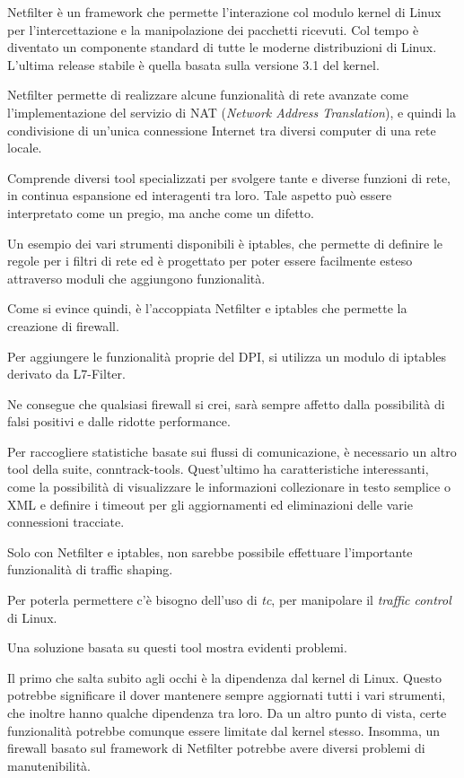 Netfilter \cite{netfilter} è un framework che permette l'interazione col modulo kernel di Linux per l'intercettazione e la manipolazione dei pacchetti ricevuti. Col tempo è diventato un componente standard di tutte le moderne distribuzioni di Linux. L'ultima release stabile è quella basata sulla versione 3.1 del kernel.

Netfilter permette di realizzare alcune funzionalità di rete avanzate come l'implementazione del servizio di NAT (\emph{Network Address Translation}), e quindi la condivisione di un'unica connessione Internet tra diversi computer di una rete locale.

Comprende diversi tool specializzati per svolgere tante e diverse funzioni di rete, in continua espansione ed interagenti tra loro. Tale aspetto può essere interpretato come un pregio, ma anche come un difetto.

Un esempio dei vari strumenti disponibili è iptables, che permette di definire le regole per i filtri di rete ed è progettato per poter essere facilmente esteso attraverso moduli che aggiungono funzionalità.

Come si evince quindi, è l'accoppiata Netfilter e iptables che permette la creazione di firewall.

Per aggiungere le funzionalità proprie del DPI, si utilizza un modulo di iptables derivato da L7-Filter.

Ne consegue che qualsiasi firewall si crei, sarà sempre affetto dalla possibilità di falsi positivi e dalle ridotte performance.

Per raccogliere statistiche basate sui flussi di comunicazione, è necessario un altro tool della suite, conntrack-tools. Quest'ultimo ha caratteristiche interessanti, come la possibilità di visualizzare le informazioni collezionare in testo semplice o XML e definire i timeout per gli aggiornamenti ed eliminazioni delle varie connessioni tracciate.

Solo con Netfilter e iptables, non sarebbe possibile effettuare l'importante funzionalità di traffic shaping.

Per poterla permettere c'è bisogno dell'uso di \emph{tc}, per manipolare il \emph{traffic control} di Linux.

Una soluzione basata su questi tool mostra evidenti problemi.

Il primo che salta subito agli occhi è la dipendenza dal kernel di Linux. Questo potrebbe significare il dover mantenere sempre aggiornati tutti i vari strumenti, che inoltre hanno qualche dipendenza tra loro. Da un altro punto di vista, certe funzionalità potrebbe comunque essere limitate dal kernel stesso. Insomma, un firewall basato sul framework di Netfilter potrebbe avere diversi problemi di manutenibilità.

